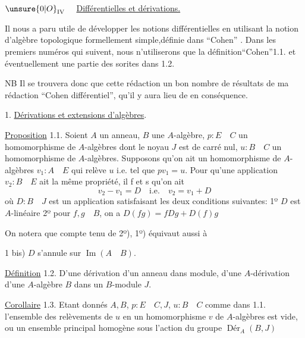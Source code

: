 $\unsure{0|O}_{\mathrm{IV}}\quad$ \uline{Différentielles et dérivations.}

 Il nous a paru utile de développer les notions différentielles en utilisant la notion d'algèbre topologique formellement simple,définie dans ``Cohen'' . Dans les premiers numéros qui suivent, nous n'utiliserons que la définition``Cohen''1.1. et éventuellement une partie des sorites  dans 1.2.

NB Il se trouvera donc que cette rédaction  un bon nombre de résultats de ma rédaction ``Cohen différentiel'', qu'il y aura lieu de  en conséquence.

1. \uline{Dérivations et extensions d'algèbres}.

\uline{Proposition} 1.1. Soient $A$ un anneau, $B$ une $A$-algèbre, $p:E\quad C$ un homomorphisme de $A$-algèbres dont le noyau $J$ est de carré nul, $u:B\quad C$ un homomorphisme de $A$-algèbres. Supposons qu'on ait un homomorphisme de $A$-algèbres $v_1:A\quad E$ qui relève $u$ i.e. tel que $pv_1=u$. Pour qu'une application $v_2:B\quad E$ ait la même propriété, il f et s qu'on ait
\[
 v_2-v_1=D\quad\text{i.e.}\quad v_2=v_1+D
\]
où $D:B\quad J$ est un application satisfaisant les deux conditions suivantes: 1º $D$ est $A$-linéaire 2º pour $f,g\quad B$, on a $D(fg)=fDg+D(f)g$

On notera que compte tenu de 2º), 1º) équivaut aussi à 

1 bis) $D$ s'annule sur $\operatorname{Im}(A\quad B)$.

\uline{Définition} 1.2. D'une dérivation d'un anneau dans  module, d'une $A$-dérivation d'une $A$-algèbre $B$ dans un $B$-module $J$.

\uline{Corollaire} 1.3. Etant donnés $A,B$,  $p:E\quad C,J$, $u:B\quad C$ comme dans 1.1.  l'ensemble des relèvements de $u$ en un homomorphisme $v$ de $A$-algèbres est vide, ou un ensemble principal homogène sous l'action du groupe $\operatorname{Dér}_A(B,J)$
